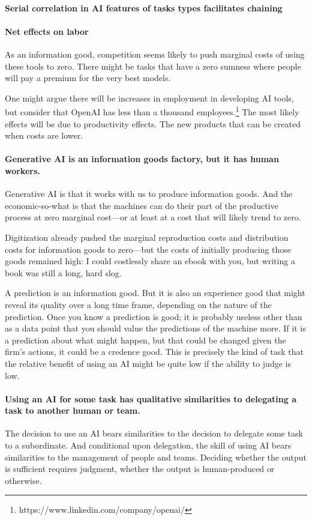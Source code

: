\documentclass{article}
\begin{document}
\paragraph{Serial correlation in AI features of tasks types facilitates chaining}

\paragraph{Net effects on labor}

As an information good, competition seems likely to push marginal costs of using these tools to zero.
There might be tasks that have a zero sumness where people will pay a premium for the very best models.

One might argue there will be increases in employment in developing AI tools, but consider that OpenAI has less than a thousand employees.\footnote{ 
  https://www.linkedin.com/company/openai/
}
The most likely effects will be due to productivity effects.
The new products that can be created when costs are lower.

\paragraph{Generative AI is an information goods factory, but it has human workers.}
Generative AI is that it works with us to produce information goods. 
And the economic-so-what is that the machines can do their part of the productive process at zero marginal cost---or at least at a cost that will likely trend to zero.

Digitization already pushed the marginal reproduction costs and distribution costs for information goods to zero---but the costs of initially producing those goods remained high: I could costlessly share an ebook with you, but writing a book was still a long, hard slog.

A prediction is an information good. 
But it is also an experience good that might reveal its quality over a long time frame, depending on the nature of the prediction. 
Once you know a prediction is good; it is probably useless other than as a data point that you should value the predictions of the machine more.
If it is a prediction about what might happen, but that could be changed given the firm's actions, it could be a credence good.
This is precisely the kind of task that the relative benefit of using an AI might be quite low if the ability to judge is low. 

\paragraph{Using an AI for some task has qualitative similarities to delegating a task to another human or team.}
The decision to use an AI bears similarities to the decision to delegate some task to a subordinate.
And conditional upon delegation, the skill of using AI bears similarities to the management of people and teams. 
Deciding whether the output is sufficient requires judgment, whether the output is human-produced or otherwise. 
\end{document}
